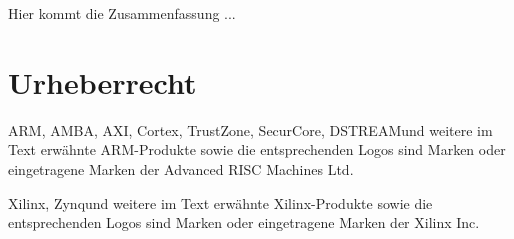 Hier kommt die Zusammenfassung ...


\cleardoublepage

\chapter*{Urheberrecht}

ARM\TReg, AMBA\TReg, AXI\TTra, Cortex\TTra, TrustZone\TTra, SecurCore\TTra  , DSTREAM\TTra und weitere im Text erwähnte ARM-Produkte sowie die entsprechenden Logos sind Marken oder eingetragene Marken der Advanced RISC Machines Ltd.\par
\vspace{0.5cm}
Xilinx\TReg, Zynq\TTra und weitere im Text erwähnte Xilinx-Produkte sowie die entsprechenden Logos sind Marken oder eingetragene Marken der Xilinx Inc.\par
\vspace{0.5cm}